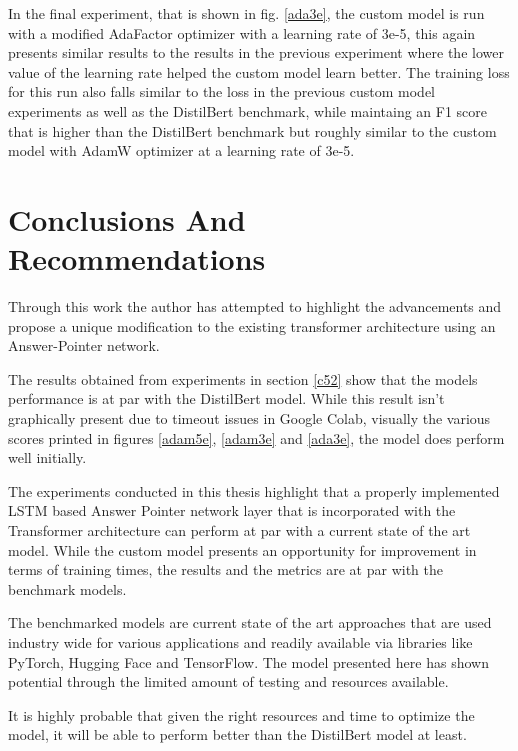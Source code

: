 \documentclass[a4paper,12pt]{report}
\begin{document}
	In the final experiment, that is shown in fig. \ref{ada3e}, the custom model is run with a modified AdaFactor optimizer with a learning rate of 3e-5, this again presents similar results to the results in the previous experiment where the lower value of the learning rate helped the custom model learn better. The training loss for this run also falls similar to the loss in the previous custom model experiments as well as the DistilBert benchmark, while maintaing an F1 score that is higher than the DistilBert benchmark but roughly similar to the custom model with AdamW optimizer at a learning rate of 3e-5.
	
	



    \chapter{Conclusions And Recommendations}\label{c6}
    
    Through this work the author has attempted to highlight the advancements and propose a unique modification to the existing transformer architecture using an Answer-Pointer network. 
    
    The results obtained from experiments in section \ref{c52} show that the models performance is at par with the DistilBert model. While this result isn't graphically present due to timeout issues in Google Colab, visually the various scores printed in figures \ref{adam5e}, \ref{adam3e} and \ref{ada3e}, the model does perform well initially. 
    
    The experiments conducted in this thesis highlight that a properly implemented LSTM based Answer Pointer network layer that is incorporated with the Transformer architecture can perform at par with a current state of the art model. 
    While the custom model presents an opportunity for improvement in terms of training times, the results and the metrics are at par with the benchmark models.
    
    The benchmarked models are current state of the art approaches that are used industry wide for various applications and readily available via libraries like PyTorch, Hugging Face and TensorFlow. The model presented here has shown potential through the limited amount of testing and resources available. 
    
    It is highly probable that given the right resources and time to optimize the model, it will be able to perform better than the DistilBert model at least. 
    
\end{document}
